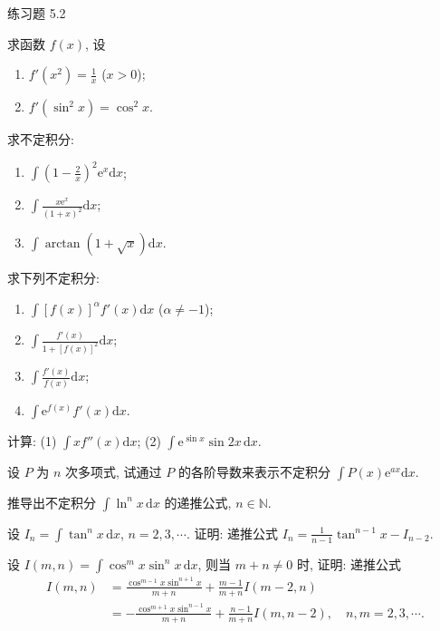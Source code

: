 \begin{exblock}{练习题 5.2}
  \item 求函数 $f(x)$, 设
  \begin{enumerate}[label=(\arabic*)]
    \item $f'(x^{2})=\frac{1}{x}$ ($x>0$);
    \item $f'(\sin^{2}x)=\cos^{2}x$.
  \end{enumerate}

  \item 求不定积分:
  \begin{enumerate}[label=(\arabic*)]
    \item $\int\left(1-\frac{2}{x}\right)^{2}\mathrm{e}^{x}\mathrm{d}x$;
    \item $\int\frac{x\mathrm{e}^{x}}{(1+x)^{2}}\mathrm{d}x$;
    \item $\int\arctan(1+\sqrt{x})\mathrm{d}x$.
  \end{enumerate}

  \item 求下列不定积分:
  \begin{enumerate}[label=(\arabic*)]
    \item $\int[f(x)]^{\alpha}f'(x)\mathrm{d}x$ ($\alpha\neq -1$);
    \item $\int\frac{f'(x)}{1+[f(x)]^{2}}\mathrm{d}x$;
    \item $\int\frac{f'(x)}{f(x)}\mathrm{d}x$;
    \item $\int\mathrm{e}^{f(x)}f'(x)\mathrm{d}x$.
  \end{enumerate}

  \item 计算: (1) $\int xf''(x)\mathrm{d}x$; (2) $\int\mathrm{e}^{\sin x}\sin 2x\,\mathrm{d}x$.

  \item 设 $P$ 为 $n$ 次多项式, 试通过 $P$ 的各阶导数来表示不定积分 $\int P(x)\mathrm{e}^{ax}\mathrm{d}x$.

  \item 推导出不定积分 $\int\ln^{n}x\,\mathrm{d}x$ 的递推公式, $n\in\mathbb{N}$.

  \item 设 $I_{n}=\int\tan^{n}x\,\mathrm{d}x$, $n=2,3,\cdots$. 证明: 递推公式 $I_{n}=\frac{1}{n-1}\tan^{n-1}x-I_{n-2}$.

  \item 设 $I(m,n)=\int\cos^{m}x\sin^{n}x\,\mathrm{d}x$, 则当 $m+n\neq 0$ 时, 证明: 递推公式
  \begin{align*}
  I(m,n)&=\frac{\cos^{m-1}x\sin^{n+1}x}{m+n}+\frac{m-1}{m+n}I(m-2,n)\\
  &=-\frac{\cos^{m+1}x\sin^{n-1}x}{m+n}+\frac{n-1}{m+n}I(m,n-2),\quad n,m=2,3,\cdots.
\end{align*}


\end{exblock}
